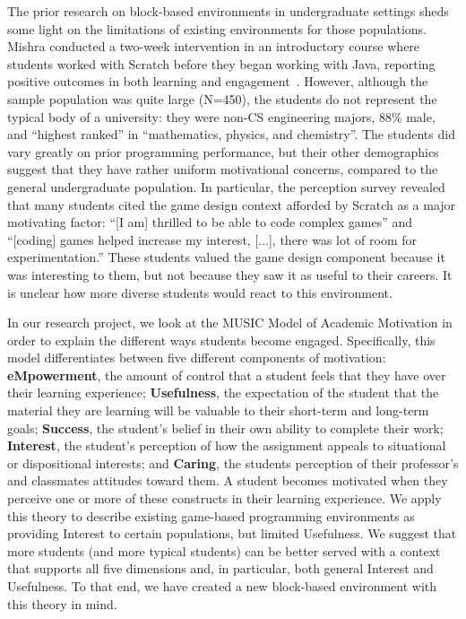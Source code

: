 \documentclass{sig-alternate}
\begin{document}
The prior research on block-based environments in undergraduate settings sheds some light on the limitations of existing environments for those populations.
Mishra conducted a two-week intervention in an introductory course where students worked with Scratch before they began working with Java, reporting positive outcomes in both learning and engagement~\cite{Mishra}.
However, although the sample population was quite large (N=450), the students do not represent the typical body of a university: they were non-CS engineering majors, 88\% male, and ``highest ranked'' in ``mathematics, physics, and chemistry''.
The students did vary greatly on prior programming performance, but their other demographics suggest that they have rather uniform motivational concerns, compared to the general undergraduate population.
In particular, the perception survey revealed that many students cited the game design context afforded by Scratch as a major motivating factor: ``[I am] thrilled to be able to code complex games'' and ``[coding] games helped increase my interest, [...], there was lot of room for experimentation.''
These students valued the game design component because it was interesting to them, but not because they saw it as useful to their careers.
It is unclear how more diverse students would react to this environment.

In our research project, we look at the MUSIC Model of Academic Motivation\cite{jones-description} in order to explain the different ways students become engaged. Specifically, this model differentiates between five different components of motivation: \textbf{eMpowerment}, the amount of control that a student feels that they have over their learning experience; \textbf{Usefulness}, the expectation of the student that the material they are learning will be valuable to their short-term and long-term goals; \textbf{Success}, the student's belief in their own ability to complete their work; \textbf{Interest}, the student's perception of how the assignment appeals to situational or dispositional interests; and \textbf{Caring}, the students perception of their professor's and classmates attitudes toward them.
A student becomes motivated when they perceive one or more of these constructs in their learning experience.
We apply this theory to describe existing game-based programming environments as providing Interest to certain populations, but limited Usefulness.
We suggest that more students (and more typical students) can be better served with a context that supports all five dimensions and, in particular, both general Interest and Usefulness.
To that end, we have created a new block-based environment with this theory in mind.
\end{document}
